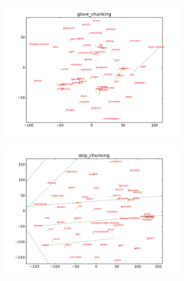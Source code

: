 \begin{figure}[h]
\begin{subfigure}{6cm}
    \includegraphics[scale=0.3]{plots/vectorField/glove_chunking.png}
	\label{fig:bestchunking}
	\subcaption{}	
\end{subfigure}
\begin{subfigure}{6cm}
	\centering
    \includegraphics[scale=0.3]{plots/vectorField/skip_chunking.png}
	\label{fig:bestchunking}
	\subcaption{}	
\end{subfigure}
\end{figure}


